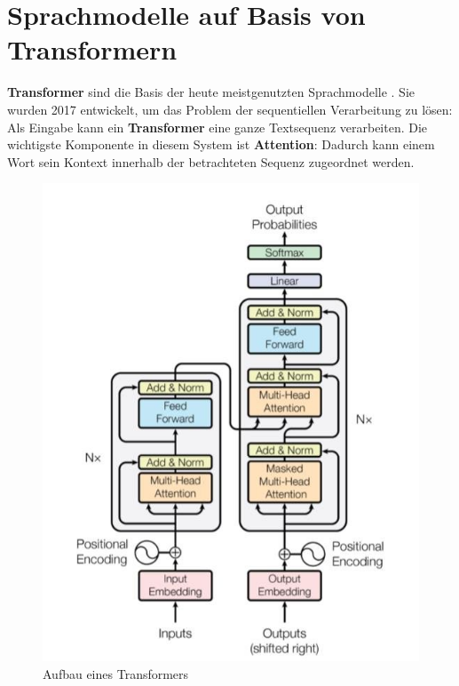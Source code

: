 \section{Sprachmodelle auf Basis von Transformern}
\textbf{Transformer} sind die Basis der heute meistgenutzten Sprachmodelle \cite{bert}\cite{gpt}. Sie wurden 2017 entwickelt, um das Problem der sequentiellen Verarbeitung zu l\"osen: Als Eingabe kann ein \textbf{Transformer} eine ganze Textsequenz verarbeiten. Die wichtigste Komponente in diesem System ist \textbf{Attention}: Dadurch kann einem Wort sein Kontext innerhalb der betrachteten Sequenz zugeordnet werden.\\
\begin{figure}[!ht]
\centering
\includegraphics{pics/attention.jpg}
\caption{Aufbau eines Transformers \cite{attention}}
\label{fig:attention}
\end{figure}


